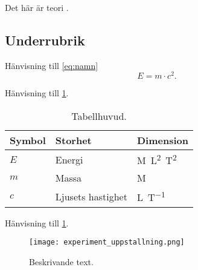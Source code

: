 Det här är teori \cite{einstein}.
\subsection{Underrubrik}
Hänvisning till \cref{eq:namn}
\begin{equation} \label{eq:namn}
    E=m \cdot c^2.
\end{equation}

Hänvisning till \cref{tab:namn}.
\begin{table}[H]
\centering
\caption{Tabellhuvud.}
\begin{tabular}{ l l l } \toprule
\textbf{Symbol} & \textbf{Storhet} & \textbf{Dimension} \\
\midrule
    $E$ & Energi & \si{M.L^2.T^{2}} \\
    $m$ & Massa &\si{M} \\
    $c$ & Ljusets hastighet & \si{L.T^{-1}} \\
\bottomrule 
\end{tabular} \label{tab:namn}
\end{table}

Hänvisning till \cref{fig:namn}.
\begin{figure} [H]
    \centering 
    \texttt{[image: experiment\_uppstallning.png]}
    \caption{Beskrivande text.}
    \label{fig:namn}
\end{figure}